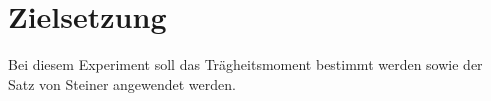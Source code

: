 \section{Zielsetzung}
\label{sec:Zielsetzung}

Bei diesem Experiment soll das Trägheitsmoment bestimmt werden sowie der Satz von Steiner angewendet werden.